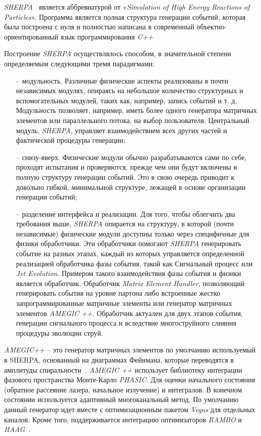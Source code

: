 \textit{SHERPA}~\cite{review-sherpa} является аббревиатурой от «\textit{Simulation of High Energy Reactions of Particles}». Программа является
полная структура генерации событий, которая была построена с нуля и полностью написана в
современный объектно-ориентированный язык программирования \textit{C++}

Построение \textit{SHERPA} осуществлялось способом, в значительной степени определяемым следующими тремя парадигмами:

\begin{enumerate}
	\item[--] модульность. Различные физические аспекты реализованы в почти независимых модулях, опираясь на
	небольшое количество структурных и вспомогательных модулей, таких как, например, запись событий и т. д. Модульность
	позволяет, например, иметь более одного генератора матричных элементов или параллельного потока,
	на выбор пользователя. Центральный модуль, \textit{SHERPA}, управляет взаимодействием
	всех других частей и фактической процедуры генерации;
	\item[--] снизу-вверх. Физические модули обычно разрабатываются сами по себе, проходят испытания и
	проверяются, прежде чем они будут включены в полную структуру генерации событий. Это в свою очередь
	приводит к довольно гибкой, минимальной структуре, лежащей в основе организации генерации событий;
	\item[--] разделение интерфейса и реализации. Для того, чтобы облегчить два требования выше,
	\textit{SHERPA} опирается на структуру, в которой (почти независимые) физические модули доступны только
	через специфичные для физики обработчики. Эти обработчики помогают \textit{SHERPA} генерировать событие на разных
	этапах, каждый из которых управляется определенной реализацией обработчика фазы события, такой как
	Сигнальный процесс или \textit{Jet Evolution}. Примером такого взаимодействия фазы события и физики является обработчик. Обработчик \textit{Matrix Element Handler}, позволяющий генерировать события на уровне партона либо
	встроенные жестко запрограммированные матричные элементы или генератор матричных элементов \textit{AMEGIC ++}. Обработчик
	актуален для двух этапов события, генерации сигнального процесса и вследствие многоструйного слияния процедуры эволюции струй.
\end{enumerate}

\textit{AMEGIC++} -- это генератор матричных элементов по умолчанию используемый в SHERPA, основанный на диаграммах Фейнмана, которые переводятся в амплитуды спиральности~\cite{review-sherpa}.\textit{ AMEGIC ++} использует библиотеку интеграции фазового пространства Монте-Карло \textit{PHASIC}. Для оценки начального состояния (обратное рассеяние лазера, начальное излучение) и интегралов. В конечном состоянии используется адаптивный многоканальный метод. По умолчанию данный генератор идет вместе с оптимизационным пакетом \textit{Vegas} для отдельных каналов. Кроме того, поддерживается интеграцию оптимизаторов \textit{RAMBO} и \textit{HAAG}~\cite{review-sherpa}.

